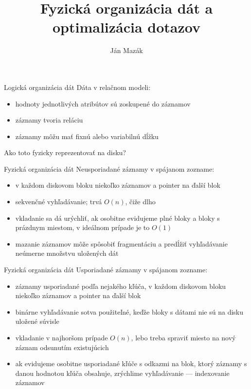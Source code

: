 \documentclass[12pt]{beamer}
\title{Fyzická organizácia dát a optimalizácia dotazov}
\author{Ján Mazák}
\institute{FMFI UK Bratislava}
\date{}
\begin{document}
\frame{\titlepage}

\begin{frame}[fragile]{Logická organizácia dát}
Dáta v relačnom modeli:
\begin{itemize}
\item hodnoty jednotlivých atribútov sú zoskupené do záznamov
\item záznamy tvoria reláciu
\item záznamy môžu mať fixnú alebo variabilnú dĺžku
\end{itemize}
\vspace*{3mm}
Ako toto fyzicky reprezentovať na disku?
\end{frame}

\begin{frame}[fragile]{Fyzická organizácia dát}
Neusporiadané záznamy v spájanom zozname:
\begin{itemize}
\item v každom diskovom bloku niekoľko záznamov a pointer na ďalší blok
\item sekvenčné vyhľadávanie; trvá $O(n)$, čiže dlho
\item vkladanie sa dá urýchliť, ak osobitne evidujeme plné bloky a bloky s prázdnym miestom, v ideálnom prípade je to $O(1)$
\item mazanie záznamov môže spôsobiť fragmentáciu a predĺžiť vyhľadávanie neúmerne množstvu uložených dát
\end{itemize}
\end{frame}

\begin{frame}[fragile]{Fyzická organizácia dát}
Usporiadané záznamy v spájanom zozname:
\begin{itemize}
\item záznamy usporiadané podľa nejakého kľúča, v každom diskovom bloku niekoľko záznamov a pointer na ďalší blok
\item binárne vyhľadávanie sotva použiteľné, keďže bloky s dátami nie sú na disku uložené súvisle
\item vkladanie v najhoršom prípade $O(n)$, lebo treba spraviť miesto na nový záznam odsunutím existujúcich
\item ak evidujeme osobitne usporiadané kľúče s odkazmi na blok, ktorý záznamy s danou hodnotou kľúča obsahuje, zrýchlime vyhľadávanie --- indexovanie záznamov
\end{itemize}
\end{frame}
\end{document}
